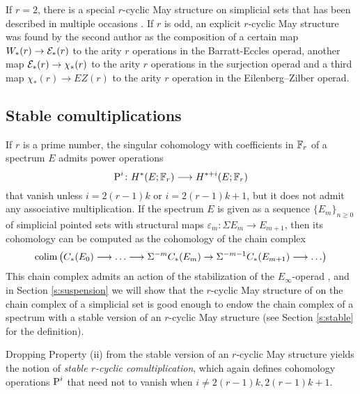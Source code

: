 If $r=2$, there is a special $r$-cyclic May structure on simplicial sets that has been described in multiple occasions \cite{steenrod1947products,gonzalez-diaz1999steenrod,medina2021fast_sq}. If $r$ is odd, an explicit $r$-cyclic May structure was found by the second author \cite{medina2021may_st} as the composition of a certain map $W_*(r)\to \mathcal{E}_*(r)$ to the arity $r$ operations in the Barratt-Eccles operad, another map $\mathcal{E}_*(r)\to \chi_*(r)$ to the arity $r$ operations in the surjection operad \cite{berger2004combinatorial} and a third map $\chi_*(r)\to EZ(r)$ to the arity $r$ operation in the Eilenberg--Zilber operad\cite{mcclure2003multivariable}.

\subsection{Stable comultiplications} If $r$ is a prime number, the singular cohomology with coefficients in $\mathbb{F}_r$ of a spectrum $E$ admits power operations
\[
\operatorname{P}^i\colon H^*(E;\mathbb{F}_r)\longrightarrow H^{*+i}(E;\mathbb{F}_r)
\]
that vanish unless $i = 2(r-1)k$ or $i = 2(r-1)k+1$, but it does not admit any associative multiplication. If the spectrum $E$ is given as a sequence $\{E_m\}_{n\geq 0}$ of simplicial pointed sets with structural maps $\varepsilon_m\colon \Sigma E_m\to E_{m+1}$, then its cohomology can be computed as the cohomology of the chain complex
\[
\operatorname*{colim} \left(C_{*}(E_0)\longrightarrow \ldots \longrightarrow \Sigma^{-m}C_{*}(E_m)\to \Sigma^{-m-1} C_{*}(E_{m+1})\longrightarrow\ldots\right)
\]
This chain complex admits an action of the stabilization of the $E_{\infty}$-operad \cite{Gill2020}, and in Section \ref{s:suspension} we will show that the $r$-cyclic May structure of \cite{medina2021may_st} on the chain complex of a simplicial set is good enough to endow the chain complex of a spectrum with a stable version of an $r$-cyclic May structure (see Section \ref{s:stable} for the definition).

Dropping Property (ii) from the stable version of an $r$-cyclic May structure yields the notion of \emph{stable $r$-cyclic comultiplication}, which again defines cohomology operations $\operatorname{P}^i$ that need not to vanish when $i \neq 2(r-1)k, 2(r-1)k+1$.


